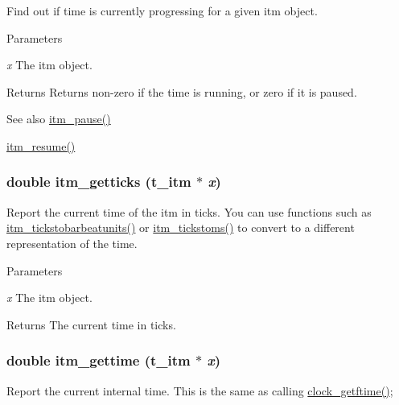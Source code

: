 Find out if time is currently progressing for a given itm object. 
\begin{DoxyParams}{Parameters}
\item[{\em x}]The itm object. \end{DoxyParams}
\begin{DoxyReturn}{Returns}
Returns non-\/zero if the time is running, or zero if it is paused. 
\end{DoxyReturn}
\begin{DoxySeeAlso}{See also}
\hyperlink{group__time_ga844cd45c507bf4c89b91f2c2713fb128}{itm\_\-pause()} 

\hyperlink{group__time_ga1f3b1dded32c2fcbd955adb094c81d98}{itm\_\-resume()} 
\end{DoxySeeAlso}
\hypertarget{group__time_gafc0e353837687e59fb54bb83ed33768f}{
\subsubsection[{itm\_\-getticks}]{\setlength{\rightskip}{0pt plus 5cm}double itm\_\-getticks ({\bf t\_\-itm} $\ast$ {\em x})}}
\label{group__time_gafc0e353837687e59fb54bb83ed33768f}


Report the current time of the itm in ticks. You can use functions such as \hyperlink{group__time_ga098ba18a9c4a10c3d92445b0bf3da025}{itm\_\-tickstobarbeatunits()} or \hyperlink{group__time_ga3ed676dca6666ab9f305ea81b8d1b6b7}{itm\_\-tickstoms()} to convert to a different representation of the time.


\begin{DoxyParams}{Parameters}
\item[{\em x}]The itm object. \end{DoxyParams}
\begin{DoxyReturn}{Returns}
The current time in ticks. 
\end{DoxyReturn}
\hypertarget{group__time_ga6be6d66ebf8825d9edacec2f3e534dcb}{
\subsubsection[{itm\_\-gettime}]{\setlength{\rightskip}{0pt plus 5cm}double itm\_\-gettime ({\bf t\_\-itm} $\ast$ {\em x})}}
\label{group__time_ga6be6d66ebf8825d9edacec2f3e534dcb}


Report the current internal time. This is the same as calling \hyperlink{group__clocks_ga04a49876d29036406f857cf22b99d9ac}{clock\_\-getftime()};


